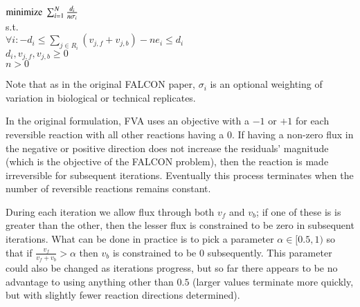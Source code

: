 \pagebreak
\begin{Algorithm}[FALCON]
\label{alg:FALCON}
\begin{algorithmic}
  \ELSE 
  \ENDIF
  \INDSTATE $\textnormal{minimize}\ \sum^N_{i=1}\frac{d_i}{n \sigma_i}$  \\
  \INDSTATE s.t. \\
  \INDSTATE $\forall i: -d_i \leq \sum_{j \in R_i}(v_{j,f} + v_{j,b}) - n e_i \leq d_i$ \\
  \INDSTATE $d_i, v_{j,f}, v_{j,b} \geq 0$ \\
  \INDSTATE $n > 0$
  \ENDIF
  \ENDIF
  \ENDFOR
\ENDWHILE
\end{algorithmic}
\end{Algorithm}
Note that as in the original FALCON paper, $\sigma_i$ is an optional weighting of variation
in biological or technical replicates. 

In the original formulation, FVA uses an objective with a $-1$ or $+1$ for each reversible reaction 
with all other reactions having a 0. If having a non-zero flux in the negative or positive direction
does not increase the residuals' magnitude (which is the objective of the FALCON problem), then 
the reaction is made irreversible for subsequent iterations. Eventually this process terminates
when the number of reversible reactions remains constant. 

During each iteration we allow flux through both $v_f$ and $v_b$; if one of these is is greater 
than the other, then the lesser flux is constrained to be zero in subsequent iterations. What
can be done in practice is to pick a parameter $\alpha \in [0.5,1)$ so that if
$\frac{v_f}{v_f+v_b} > \alpha$ then $v_b$ is constrained to be 0 subsequently. This parameter could
also be changed as iterations progress, but so far there appears to be no advantage to using
anything other than $0.5$ (larger values terminate more quickly, but with slightly fewer reaction
directions determined).

